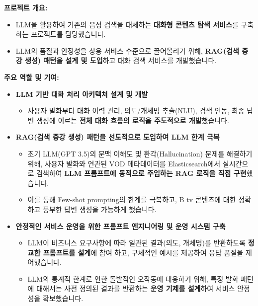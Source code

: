 \documentclass[letterpaper,11pt]{article}
\begin{document}
    {
      \resumeSubProjectListStart

        {
          \textbf{프로젝트 개요:}
          \begin{itemize}[leftmargin=*]
              \item LLM을 활용하여 기존의 음성 검색을 대체하는 \textbf{대화형 콘텐츠 탐색 서비스}를 구축하는 프로젝트를 담당했습니다.
              \item LLM의 품질과 안정성을 상용 서비스 수준으로 끌어올리기 위해, \textbf{RAG(검색 증강 생성) 패턴을 설계 및 도입}하고 대화 검색 서비스를 개발했습니다.
          \end{itemize}

          \textbf{주요 역할 및 기여:}
          \begin{itemize}[leftmargin=*]
              \item \textbf{LLM 기반 대화 처리 아키텍처 설계 및 개발}
                  \begin{itemize}[leftmargin=*, label=$\circ$]
                      \item 사용자 발화부터 대화 이력 관리, 의도/개체명 추출(NLU), 검색 연동, 최종 답변 생성에 이르는 \textbf{전체 대화 흐름의 로직을 주도적으로 개발}했습니다.
                  \end{itemize}

              \item \textbf{RAG(검색 증강 생성) 패턴을 선도적으로 도입하여 LLM 한계 극복}
                  \begin{itemize}[leftmargin=*, label=$\circ$]
                      \item 초기 LLM(GPT 3.5)의 문맥 이해도 및 환각(Hallucination) 문제를 해결하기 위해, 사용자 발화와 연관된 VOD 메타데이터를 Elasticsearch에서 실시간으로 검색하여 \textbf{LLM 프롬프트에 동적으로 주입하는 RAG 로직을 직접 구현}했습니다.
                      \item 이를 통해 Few-shot prompting의 한계를 극복하고, B tv 콘텐츠에 대한 정확하고 풍부한 답변 생성을 가능하게 했습니다.
                  \end{itemize}
                  
              \item \textbf{안정적인 서비스 운영을 위한 프롬프트 엔지니어링 및 운영 시스템 구축}
                  \begin{itemize}[leftmargin=*, label=$\circ$]
                      \item LLM이 비즈니스 요구사항에 따라 일관된 결과(의도, 개체명)를 반환하도록 \textbf{정교한 프롬프트를 설계}에 참여 하고, 구체적인 예시를 제공하여 응답 품질을 제어했습니다.
                      \item LLM의 통계적 한계로 인한 돌발적인 오작동에 대응하기 위해, 특정 발화 패턴에 대해서는 사전 정의된 결과를 반환하는 \textbf{운영 기제를 설계}하여 서비스 안정성을 확보했습니다.
                  \end{itemize}
                  

\end{itemize}}}
\end{document}
